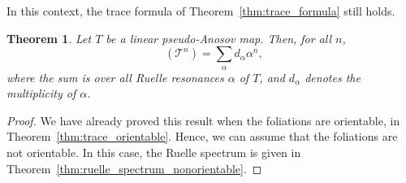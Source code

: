 \documentclass[JEP,XML,SOM,Unicode]{cedram}
\newcommand{\boT}{\mathcal{T}}
\DeclareMathOperator{\flattr}{\mathrm{tr}^{\flat}}
\newtheorem{thm}{Theorem}[section]
\theoremstyle{definition}
\numberwithin{equation}{section}
\begin{document}
In this context, the trace formula of Theorem~\ref{thm:trace_formula} still
holds.
\begin{thm}
Let $T$ be a linear pseudo-Anosov map. Then, for all $n$,
\begin{equation}
\label{eq:wsldfjknrt,nwfkjh}
\flattr(\boT^n) = \sum_\alpha d_\alpha \alpha^n,
\end{equation}
where the sum is over all Ruelle resonances $\alpha$ of $T$, and $d_\alpha$
denotes the multiplicity of $\alpha$.
\end{thm}
\begin{proof}
We have already proved this result when the foliations are orientable, in
Theorem~\ref{thm:trace_orientable}. Hence, we can assume that the foliations
are not orientable. In this case, the Ruelle spectrum is given in
Theorem~\ref{thm:ruelle_spectrum_nonorientable}.


\end{proof}
\end{document}
